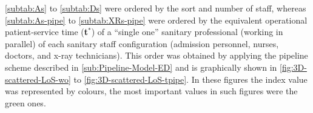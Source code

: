 \documentclass[11pt]{article} %
\begin{document}
\begin{table}[H]
\caption{  %
14 Doctor (D) cases. DR\textit{i} represents
Diagnosis Room \emph{i}. Where DJ means Doctor Junior, whereas DS
means Doctor Senior. \label{subtab:Ds} %
}
\centering{}
\end{table}


\ref{subtab:As} to \ref{subtab:Ds} were ordered by the sort and
number of staff, whereas \ref{subtab:As-pipe} to \ref{subtab:XRs-pipe}
were ordered by the equivalent operational patient-service time ({\bf t$^*$})
of a ``single one'' sanitary professional (working in parallel)
of each sanitary staff configuration (admission personnel, nurses,
doctors, and x-ray technicians). This order was obtained by applying
the pipeline scheme described in \ref{sub:Pipeline-Model-ED} and
is graphically shown in \ref{fig:3D-scattered-LoS-wo} to \ref{fig:3D-scattered-LoS-tpipe}.
In these figures the index value was represented by colours, the most
important values in such figures were the green ones. 
\end{document}
